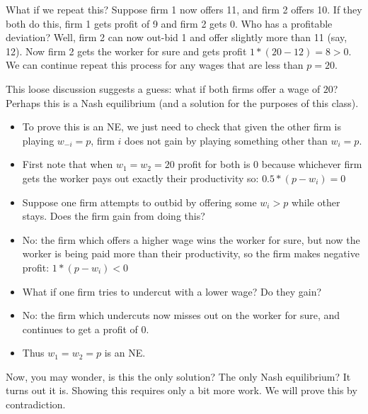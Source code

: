 \documentclass{article}
\begin{document}
What if we repeat this? Suppose firm 1 now offers 11, and firm 2 offers 10. If they both do this, firm 1 gets profit of 9 and firm 2 gets 0. Who has a profitable deviation? Well, firm 2 can now out-bid 1 and offer slightly more than 11 (say, 12). Now firm 2 gets the worker for sure and gets profit $1*(20-12)=8>0$. We can continue repeat this process for any wages that are less than $p=20$.

This loose discussion suggests a guess: what if both firms offer a wage of $20$? Perhaps this is a Nash equilibrium (and a solution for the purposes of this class).
\begin{itemize}
    \item To prove this is an NE, we just need to check that given the other firm is playing $w_{-i}=p$, firm $i$ does not gain by playing something other than $w_i=p$.
    \item First note that when $w_1=w_2=20$ profit for both is 0 because whichever firm gets the worker pays out exactly their productivity so: $0.5*(p-w_i)=0$
    \item Suppose one firm attempts to outbid by offering some $w_i>p$ while other stays. Does the firm gain from doing this?
    \item No: the firm which offers a higher wage wins the worker for sure, but now the worker is being paid more than their productivity, so the firm makes negative profit: $1*(p-w_i)<0$
    \item What if one firm tries to undercut with a lower wage? Do they gain?
    \item No: the firm which undercuts now misses out on the worker for sure, and continues to get a profit of 0.
    \item Thus $w_1=w_2=p$ is an NE.
\end{itemize}

Now, you may wonder, is this the only solution? The only Nash equilibrium? It turns out it is. Showing this requires only a bit more work. We will prove this by contradiction.
\end{document}
